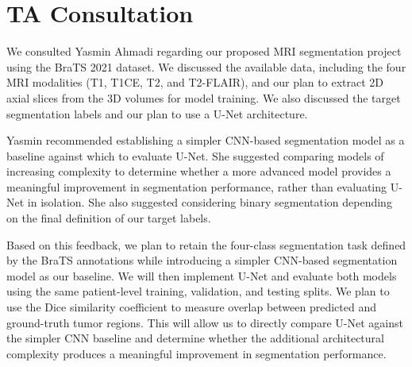 

\section{TA Consultation}

We consulted Yasmin Ahmadi regarding our proposed MRI segmentation
project using the BraTS 2021 dataset. We discussed the available
data, including the four MRI modalities (T1, T1CE, T2, and T2-FLAIR),
and our plan to extract 2D axial slices from the 3D volumes for
model training. We also discussed the target segmentation labels
and our plan to use a U-Net architecture.

Yasmin recommended establishing a simpler CNN-based segmentation
model as a baseline against which to evaluate U-Net. She suggested comparing models
of increasing complexity to determine whether a more advanced
model provides a meaningful improvement in segmentation performance, rather
than evaluating U-Net in isolation.
She also suggested considering binary segmentation depending on
the final definition of our target labels.

Based on this feedback, we plan to retain the four-class
segmentation task defined by the BraTS annotations while
introducing a simpler CNN-based segmentation model as our
baseline. We will then implement U-Net and evaluate both models using
the same patient-level training, validation, and testing splits.
We plan to use the Dice similarity coefficient to measure overlap
between predicted and ground-truth tumor regions. This will
allow us to directly compare U-Net against the simpler CNN
baseline and determine whether the additional architectural
complexity produces a meaningful improvement in segmentation
performance.